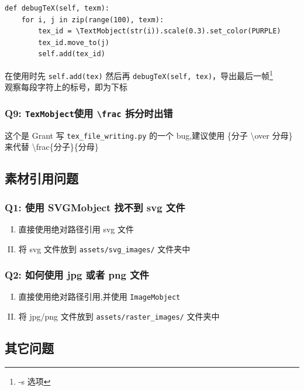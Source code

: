 \documentclass[a4paper]{article}
\newcommand{\TexMobject}{\texttt{TexMobject}}
\newcommand{\TextMobject}{\texttt{TextMobject}}
\begin{document}
\begin{lstlisting}
def debugTeX(self, texm):
    for i, j in zip(range(100), texm):
        tex_id = \TextMobject(str(i)).scale(0.3).set_color(PURPLE)
        tex_id.move_to(j)
        self.add(tex_id)
\end{lstlisting}

在使用时先 \texttt{self.add(tex)} 然后再 \texttt{debugTeX(self, tex)}，导出最后一帧\footnote{-s 选项}\\
观察每段字符上的标号，即为下标

\subsubsection*{Q9: \TexMobject 使用 \texttt{\textbackslash frac} 拆分时出错}
这个是 Grant 写 \texttt{tex\_file\_writing.py} 的一个 bug,建议使用 \{分子 \textbackslash over 分母\} 来代替 \textbackslash frac\{分子\}\{分母\}

\subsection{素材引用问题}

\subsubsection*{Q1: 使用 SVGMobject 找不到 svg 文件}
\begin{enumerate}[I.]
    \item 直接使用绝对路径引用 svg 文件
    \item 将 svg 文件放到 \texttt{assets/svg\_images/} 文件夹中
\end{enumerate}

\subsubsection*{Q2: 如何使用 jpg 或者 png 文件}
\begin{enumerate}[I.]
    \item 直接使用绝对路径引用,并使用 \texttt{ImageMobject}
    \item 将 jpg/png 文件放到 \texttt{assets/raster\_images/} 文件夹中
\end{enumerate}

\begin{center}
    \section{其它问题}
\end{center}
\end{document}
